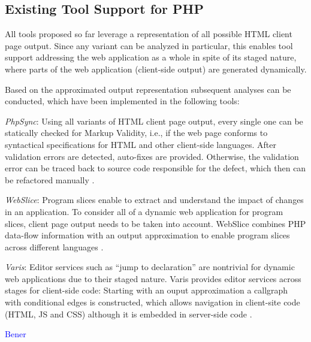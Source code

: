 \documentclass[preprint]{sig-alternate-05-2015}
\begin{document}
\subsection{Existing Tool Support for PHP}
All tools proposed so far leverage a representation of all possible HTML client page output. Since any variant can be analyzed in particular, this enables tool support addressing the web application as a whole in spite of its staged nature, where parts of the web application (client-side output) are generated dynamically. 

Based on the approximated output representation subsequent analyses can be conducted, which have been implemented in the following tools:

\begin{compactitem}
\item \emph{PhpSync}: Using all variants of  HTML client page output, every
single one can be statically checked for Markup Validity, i.e., if the web page
conforms to syntactical specifications for HTML and other client-side
languages. After validation errors are detected, auto-fixes are provided.
Otherwise, the validation error can be traced back to source code responsible
for the defect, which then can be refactored manually
\cite{Nguyen:2011:AFH:2190078.2190142}.

\item \emph{WebSlice}: Program slices enable to extract and understand the
impact of changes in an application. To consider all of a dynamic web
application for program slices, client page output needs to be taken into
account. WebSlice combines PHP data-flow information with an output
approximation to enable program slices across different languages
\cite{Nguyen:2015:CPS:2786805.2786872}.

\item \emph{Varis}: Editor services such as “jump to declaration” are
nontrivial for dynamic web applications due to their staged nature. Varis
provides editor services across stages for client-side code: Starting with an
ouput approximation a callgraph with conditional edges is constructed, which
allows navigation in client-site code (HTML, JS and CSS) although it is
embedded in server-side code
\cite{Nguyen:2015:VIS:2819009.2819140,Nguyen:2014:BCG:2635868.2635928}.
\end{compactitem}

\textcolor{blue}{Bener}

\end{document}
